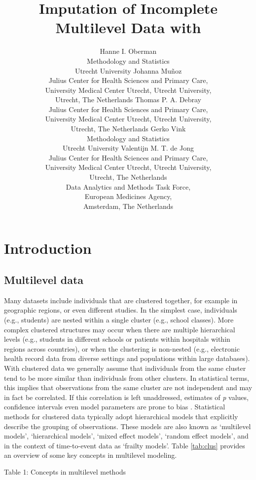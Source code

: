 \documentclass[
]{jss}
\author{
Hanne I. Oberman\\Methodology and Statistics\\
Utrecht University \And Johanna Muñoz\\Julius Center for Health Sciences
and Primary Care,\\
University Medical Center Utrecht, Utrecht University,\\
Utrecht, The Netherlands \AND Thomas P. A. Debray\\Julius Center
for Health Sciences and Primary Care,\\
University Medical Center Utrecht, Utrecht University,\\
Utrecht, The Netherlands \And Gerko Vink\\Methodology and Statistics\\
Utrecht University \AND Valentijn M. T. de Jong\\Julius Center for
Health Sciences and Primary Care,\\
University Medical Center Utrecht, Utrecht University,\\
Utrecht, The Netherlands\\
Data Analytics and Methods Task Force,\\
European Medicines Agency,\\
Amsterdam, The Netherlands
}
\title{Imputation of Incomplete Multilevel Data with \proglang{R}}
\begin{document}
\hypertarget{introduction}{%
\section{Introduction}\label{introduction}}

\hypertarget{multilevel-data}{%
\subsection{Multilevel data}\label{multilevel-data}}

Many datasets include individuals that are clustered together, for
example in geographic regions, or even different studies. In the
simplest case, individuals (e.g., students) are nested within a single
cluster (e.g., school classes). More complex clustered structures may
occur when there are multiple hierarchical levels (e.g., students in
different schools or patients within hospitals within regions across
countries), or when the clustering is non-nested (e.g., electronic
health record data from diverse settings and populations within large
databases). With clustered data we generally assume that individuals
from the same cluster tend to be more similar than individuals from
other clusters. In statistical terms, this implies that observations
from the same cluster are not independent and may in fact be correlated.
If this correlation is left unaddressed, estimates of \emph{p} values,
confidence intervals even model parameters are prone to bias
\citep{loca01}. Statistical methods for clustered data typically adopt
hierarchical models that explicitly describe the grouping of
observations. These models are also known as `multilevel models',
`hierarchical models', `mixed effect models', `random effect models',
and in the context of time-to-event data as `frailty models'. Table
\ref{tab:clus} provides an overview of some key concepts in multilevel
modeling.

Table 1: Concepts in multilevel methods
\end{document}
